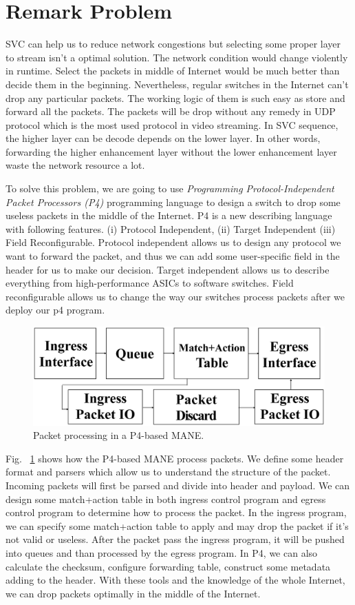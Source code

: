 \section{Remark Problem} \label{sec:Remark Problem}

SVC can help us to reduce network congestions but selecting some proper layer to stream isn't a optimal solution. The network condition would change violently in runtime. Select the packets in middle of Internet would be much better than decide them in the beginning. Nevertheless, regular switches in the Internet can't drop any particular packets. The working logic of them is such easy as store and forward all the packets. The packets will be drop without any remedy in UDP protocol which is the most used protocol in video streaming. In SVC sequence, the higher layer can be decode depends on the lower layer. In other words, forwarding the higher enhancement layer without the lower enhancement layer waste the network resource a lot. 

To solve this problem, we are going to use {\em Programming Protocol-Independent Packet Processors (P4)} programming language to design a switch to drop some useless packets in the middle of the Internet. P4 is a new describing language with following features. (i) Protocol Independent, (ii) Target Independent (iii) Field Reconfigurable. Protocol independent allows us to design any protocol we want to forward the packet, and thus we can add some user-specific field in the header for us to make our decision. Target independent allows us to describe everything from high-performance ASICs to software switches. Field reconfigurable allows us to change the way our switches process packets after we deploy our p4 program. 

\begin{figure}[tbh]
    \centering
    \includegraphics[width=.24\textwidth]{fig/MANE_1.eps}
    \caption{Packet processing in a P4-based MANE.}
    \label{MANE}
\end{figure}

Fig. ~\ref{MANE} shows how the P4-based MANE process packets. We define some header format and parsers which allow us to understand the structure of the packet. Incoming packets will first be parsed and divide into header and payload. We can design some match+action table in both ingress control program and egress control program to determine how to process the packet. In the ingress program, we can specify some match+action table to apply and may drop the packet if it's not valid or useless. After the packet pass the ingress program, it will be pushed into queues and than processed by the egress program. In P4, we can also calculate the checksum, configure forwarding table, construct some metadata adding to the header. With these tools and the knowledge of the whole Internet,  we can drop packets optimally in the middle of the Internet. 


